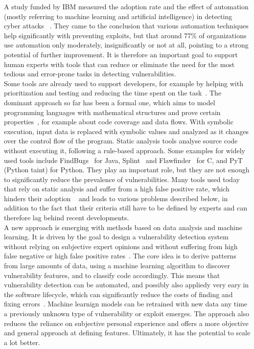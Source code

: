 \documentclass[
	a4paper,
	pagesize,
	pdftex,
	12pt,
	twoside, %
	BCOR=5mm, %
	ngerman,
	fleqn,
	final,
	]{scrartcl}
\begin{document}
A study funded by IBM measured the adoption rate and the effect of automation (mostly referring to machine learning and artificial intelligence) in detecting cyber attacks ~\cite{IBMNewsRoom.}. They came to the conclusion that various automation techniques help significantly with preventing exploits, but that around 77\% of organizations use automation only moderately, insignificantly or not at all, pointing to a strong potential of further improvement. It is therefore an important goal to support human experts with tools that can reduce or eliminate the need for the most tedious and error-prone tasks in detecting vulnerabilities.\\
Some tools are already used to support developers, for example by helping with prioritization and testing and reducing the time spent on the task~\cite{Dam.2017}. The dominant approach so far has been a formal one, which aims to model programming languages with mathematical structures and prove certain properties~\cite{Allamanis.2018}, for example about code coverage and data flows. With symbolic execution, input data is replaced with symbolic values and analyzed as it changes over the control flow of the program. Static analysis tools analyse source code without executing it, following a rule-based approach. Some examples for widely used tools include FindBugs~\cite{Hovemeyer.2004,Hovemeyer.2005} for Java, Splint~\cite{Evans.2002} and Flawfinder~\cite{Wheeler.2006} for C, and PyT~\cite{Micheelsen.2016} (Python taint) for Python. They play an important role, but they are not enough to significantly reduce the prevalence of vulnerabilities. Many tools used today that rely on static analysis and suffer from a high false positive rate, which hinders their adoption ~\cite{Liu.2018} and leads to various problems described below, in addition to the fact that their criteria still have to be defined by experts and can therefore lag behind recent developments.\\
A new approach is emerging with methods based on data analysis and machine learning. It is driven by the goal to design a vulnerability detection system without relying on subjective expert opinions and without suffering from high false negative or high false positive rates~\cite{Li.2018}. The core idea is to derive patterns from large amounts of data, using a machine learning algorithm to discover vulnerability features, and to classify code accordingly. This means that vulnerability detection can be automated, and possibly also appliedy very eary in the software lifecycle, which can significantly reduce the costs of finding and fixing errors~\cite{Dam.2017}. Machine learnign models can be retrained with new data any time a previously unknown type of vulnerability or exploit emerges. The approach also reduces the reliance on subjective personal experience and offers a more objective and general approach at defining features. Ultimately, it has the potential to scale a lot better.
\end{document}
